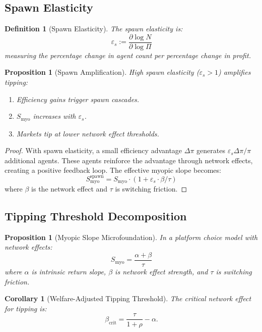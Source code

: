 \documentclass[12pt]{article}
\newtheorem{proposition}[theorem]{Proposition}
\newtheorem{corollary}[theorem]{Corollary}
\newtheorem{definition}[theorem]{Definition}
\begin{document}
\subsection{Spawn Elasticity}

\begin{definition}[Spawn Elasticity]
The \emph{spawn elasticity} is:
\[
\varepsilon_s := \frac{\partial \log N}{\partial \log \Pi}
\]
measuring the percentage change in agent count per percentage change in profit.
\end{definition}

\begin{proposition}[Spawn Amplification]
\label{prop:spawn-amplification}
High spawn elasticity ($\varepsilon_s > 1$) amplifies tipping:
\begin{enumerate}
    \item Efficiency gains trigger spawn cascades.
    \item $S_{\mathrm{myo}}$ increases with $\varepsilon_s$.
    \item Markets tip at lower network effect thresholds.
\end{enumerate}
\end{proposition}

\begin{proof}
With spawn elasticity, a small efficiency advantage $\Delta \pi$ generates $\varepsilon_s \Delta \pi / \pi$ additional agents. These agents reinforce the advantage through network effects, creating a positive feedback loop. The effective myopic slope becomes:
\[
S_{\mathrm{myo}}^{\mathrm{spawn}} = S_{\mathrm{myo}} \cdot (1 + \varepsilon_s \cdot \beta / \tau)
\]
where $\beta$ is the network effect and $\tau$ is switching friction.
\end{proof}

\subsection{Tipping Threshold Decomposition}

\begin{proposition}[Myopic Slope Microfoundation]
\label{prop:myopic-micro}
In a platform choice model with network effects:
\[
S_{\mathrm{myo}} = \frac{\alpha + \beta}{\tau}
\]
where $\alpha$ is intrinsic return slope, $\beta$ is network effect strength, and $\tau$ is switching friction.
\end{proposition}

\begin{corollary}[Welfare-Adjusted Tipping Threshold]
\label{cor:welfare-threshold}
The critical network effect for tipping is:
\[
\beta_{\mathrm{crit}} = \frac{\tau}{1 + \rho} - \alpha.
\]
\end{corollary}
\end{document}
